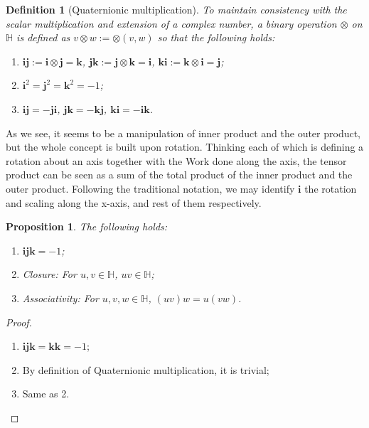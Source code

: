 \documentclass[12pt]{article}
\newtheorem*{definition}{Definition}
\newtheorem*{proposition}{Proposition}
\begin{document}
    \begin{definition}[Quaternionic multiplication]
        To maintain consistency with the scalar multiplication and extension of a complex number, a binary operation $\otimes$ on $\mathbb{H}$ is defined as $v\otimes w := \otimes (v,w)$ so that the following holds:\begin{enumerate}
            \item $\mathbf{i}\mathbf{j}:=\mathbf{i}\otimes \mathbf{j}=\mathbf{k}$, $\mathbf{j}\mathbf{k}:=\mathbf{j}\otimes \mathbf{k}=\mathbf{i}$, $\mathbf{k}\mathbf{i}:=\mathbf{k}\otimes \mathbf{i}=\mathbf{j}$;
            \item $\mathbf{i}^2=\mathbf{j}^2=\mathbf{k}^2=-1$;
            \item $\mathbf{i}\mathbf{j}=-\mathbf{j}\mathbf{i}$, $\mathbf{j}\mathbf{k}=-\mathbf{k}\mathbf{j}$, $\mathbf{k}\mathbf{i}=-\mathbf{i}\mathbf{k}$.
        \end{enumerate}
    \end{definition}

    As we see, it seems to be a manipulation of inner product and the outer product, but the whole concept is built upon rotation. Thinking each of which is defining a rotation about an axis together with the Work done along the axis, the tensor product can be seen as a sum of the total product of the inner product and the outer product. Following the traditional notation, we may identify $\mathbf{i}$ the rotation and scaling along the x-axis, and rest of them respectively.

    \begin{proposition}
        The following holds:\begin{enumerate}
            \item $\mathbf{i}\mathbf{j}\mathbf{k}=-1$;
            \item Closure: For $u,v\in \mathbb{H}$, $uv\in \mathbb{H}$;
            \item Associativity: For $u,v,w\in \mathbb{H}$, $(uv)w=u(vw)$.
        \end{enumerate}
    \end{proposition}

    \begin{proof}
        \begin{enumerate}
            \item $\mathbf{i}\mathbf{j}\mathbf{k}=\mathbf{k}\mathbf{k}=-1$;
            \item By definition of Quaternionic multiplication, it is trivial;
            \item Same as 2.
        \end{enumerate}
    \end{proof}
\end{document}
